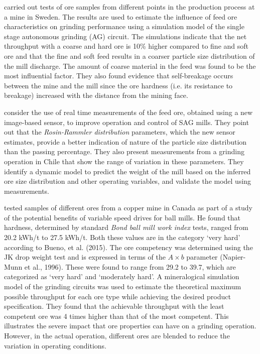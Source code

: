 \cite{hahne_ore_2003} carried out tests of ore samples from different points in the production process at a mine in Sweden. The results are used to estimate the influence of feed ore characteristics on grinding performance using a simulation model of the single stage autonomous grinding (AG) circuit. The simulations indicate that the net throughput with a coarse and hard ore is 10\% higher compared to fine and soft ore and that the fine and soft feed results in a coarser particle size distribution of the mill discharge. The amount of coarse material in the feed was found to be the most influential factor. They also found evidence that self-breakage occurs between the mine and the mill since the ore hardness (i.e. its resistance to breakage) increased with the distance from the mining face.

\cite{nunez_characterization_2011} consider the use of real time measurements of the feed ore, obtained using a new image-based sensor, to improve operation and control of \gls{SAG} mills. They point out that the \textit{Rosin-Rammler distribution} parameters, which the new sensor estimates, provide a better indication of nature of the particle size distribution than the passing percentage. They also present measurements from a grinding operation in Chile that show the range of variation in these parameters. They identify a dynamic model to predict the weight of the mill based on the inferred ore size distribution and other operating variables, and validate the model using measurements.

\cite{liu_development_2018} tested samples of different ores from a copper mine in Canada as part of a study of the potential benefits of variable speed drives for ball mills. He found that hardness, determined by standard \textit{Bond ball mill work index} tests, ranged from 20.2 kWh/t to 27.5 kWh/t. Both these values are in the category `very hard' according to Bueno, et al. (2015). The ore competency was determined using the JK drop weight test and is expressed in terms of the $A\times{b}$ parameter (Napier-Munn et al., 1996). These were found to range from 29.2 to 39.7, which are categorized as `very hard' and `moderately hard'. A mineralogical simulation model of the grinding circuits was used to estimate the theoretical maximum possible throughput for each ore type while achieving the desired product specification. They found that the achievable throughput with the least competent ore was 4 times higher than that of the most competent. This illustrates the severe impact that ore properties can have on a grinding operation. However, in the actual operation, different ores are blended to reduce the variation in operating conditions.

